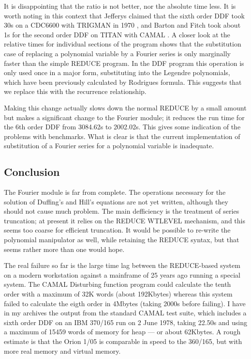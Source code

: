 It is disappointing that the ratio is not better, nor the absolute
time less.  It is worth noting in this context that Jefferys claimed
that the sixth order DDF took 30s on a CDC6600 with TRIGMAN in 1970
\cite{Jefferys:70}, and Barton and Fitch took about 1s for the second
order DDF on TITAN with CAMAL \cite{Barton72}.  A closer look at the
relative times for individual sections of the program shows that the
substitution case of replacing a polynomial variable by a Fourier
series is only marginally faster than the simple REDUCE program.  In
the DDF program this operation is only used once in a major form,
substituting into the Legendre polynomials, which have been previously
calculated by Rodrigues formula.  This suggests that we replace this
with the recurrence relationship.

Making this change actually slows down the normal REDUCE by a small
amount but makes a significant change to the Fourier module; it
reduces the run time for the 6th order DDF from 3084.62s to 2002.02s.
This gives some indication of the problems with benchmarks.  What is
clear is that the current implementation of substitution of a Fourier
series for a polynomial variable is inadequate.

\subsection{Conclusion}

The Fourier module is far from complete.  The operations necessary for
the solution of Duffing's and Hill's equations are not yet written,
although they should not cause much problem.  The main defficiency is
the treatment of series truncation; at present it relies on the REDUCE
WTLEVEL mechanism, and this seems too coarse for efficient truncation.
It would be possible to re-write the polynomial manipulator as well,
while retaining the REDUCE syntax, but that seems rather more than one
would hope.

The real failure so far is the large time lag between the REDUCE-based
system on a modern workstation against a mainframe of 25 years ago
running a special system.  The CAMAL Disturbing function program could
calculate the tenth order with a maximum of 32K words (about
192Kbytes) whereas this system failed to calculate the eigth order in
4Mbytes (taking 2000s before failing).  I have in my archives the
output from the standard CAMAL test suite, which includes a sixth
order DDF on an IBM 370/165 run on 2 June 1978, taking 22.50s and
using a maximum of 15459 words of memory for heap --- or about
62Kbytes.  A rough estimate is that the Orion 1/05 is comparable in
speed to the 360/165, but with more real memory and virtual memory.

